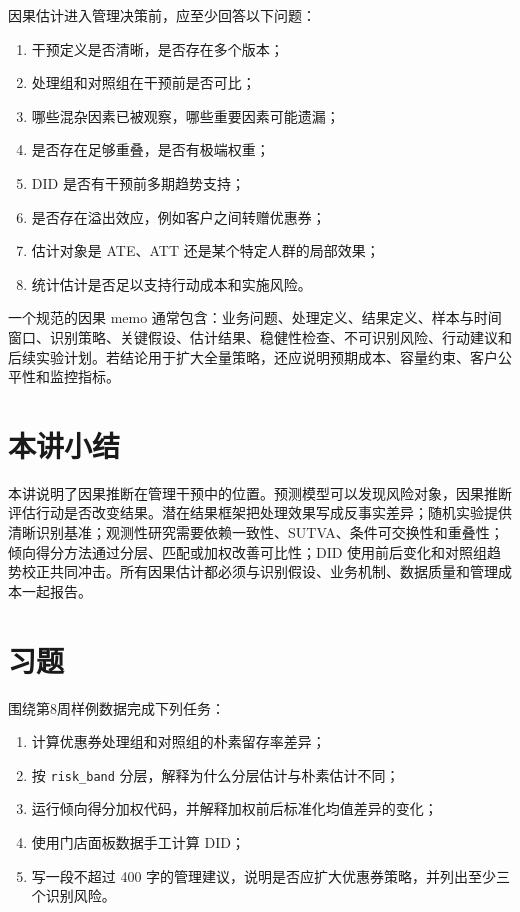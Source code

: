 \documentclass[UTF8,fontset=fandol,openany,zihao=-4]{ctexbook}
\begin{document}
因果估计进入管理决策前，应至少回答以下问题：
\begin{enumerate}
  \item 干预定义是否清晰，是否存在多个版本；
  \item 处理组和对照组在干预前是否可比；
  \item 哪些混杂因素已被观察，哪些重要因素可能遗漏；
  \item 是否存在足够重叠，是否有极端权重；
  \item DID 是否有干预前多期趋势支持；
  \item 是否存在溢出效应，例如客户之间转赠优惠券；
  \item 估计对象是 ATE、ATT 还是某个特定人群的局部效果；
  \item 统计估计是否足以支持行动成本和实施风险。
\end{enumerate}

一个规范的因果 memo 通常包含：业务问题、处理定义、结果定义、样本与时间窗口、识别策略、关键假设、估计结果、稳健性检查、不可识别风险、行动建议和后续实验计划。若结论用于扩大全量策略，还应说明预期成本、容量约束、客户公平性和监控指标。

\section*{本讲小结}

本讲说明了因果推断在管理干预中的位置。预测模型可以发现风险对象，因果推断评估行动是否改变结果。潜在结果框架把处理效果写成反事实差异；随机实验提供清晰识别基准；观测性研究需要依赖一致性、SUTVA、条件可交换性和重叠性；倾向得分方法通过分层、匹配或加权改善可比性；DID 使用前后变化和对照组趋势校正共同冲击。所有因果估计都必须与识别假设、业务机制、数据质量和管理成本一起报告。

\section*{习题}

\begin{exercise}
围绕第8周样例数据完成下列任务：
\begin{enumerate}
  \item 计算优惠券处理组和对照组的朴素留存率差异；
  \item 按 \texttt{risk\_band} 分层，解释为什么分层估计与朴素估计不同；
  \item 运行倾向得分加权代码，并解释加权前后标准化均值差异的变化；
  \item 使用门店面板数据手工计算 DID；
  \item 写一段不超过 400 字的管理建议，说明是否应扩大优惠券策略，并列出至少三个识别风险。
\end{enumerate}
\end{exercise}
\end{document}
